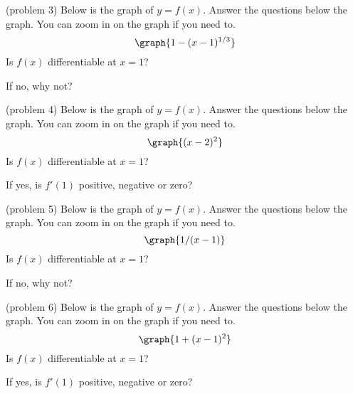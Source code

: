 \documentclass[handout]{ximera}
\begin{document}
\begin{problem}(problem 3)
Below is the graph of $y = f(x)$.  Answer the questions below the graph.  You can zoom in on the graph if you need to.
\[
\graph{1 - (x-1)^{1/3}}
\]
Is $f(x)$ differentiable at $x = 1$?
\begin{multipleChoice}
\end{multipleChoice}
If no, why not?
\begin{multipleChoice}
\end{multipleChoice}
\end{problem}



\begin{problem}(problem 4)
Below is the graph of $y = f(x)$.  Answer the questions below the graph.  You can zoom in on the graph if you need to.
\[
\graph{(x-2)^2}
\]
Is $f(x)$ differentiable at $x = 1$?
\begin{multipleChoice}
\end{multipleChoice}
If yes, is $f'(1)$ positive, negative or zero?
\begin{multipleChoice}
\end{multipleChoice}
\end{problem}


\begin{problem}(problem 5)
Below is the graph of $y = f(x)$.  Answer the questions below the graph.  You can zoom in on the graph if you need to.
\[
\graph{1/(x-1)}
\]
Is $f(x)$ differentiable at $x = 1$?
\begin{multipleChoice}
\end{multipleChoice}
If no, why not?
\begin{multipleChoice}
\end{multipleChoice}
\end{problem}



\begin{problem}(problem 6)
Below is the graph of $y = f(x)$.  Answer the questions below the graph.  You can zoom in on the graph if you need to.
\[
\graph{1 + (x-1)^2}
\]
Is $f(x)$ differentiable at $x = 1$?
\begin{multipleChoice}
\end{multipleChoice}
If yes, is $f'(1)$ positive, negative or zero?
\begin{multipleChoice}
\end{multipleChoice}
\end{problem}
\end{document}
